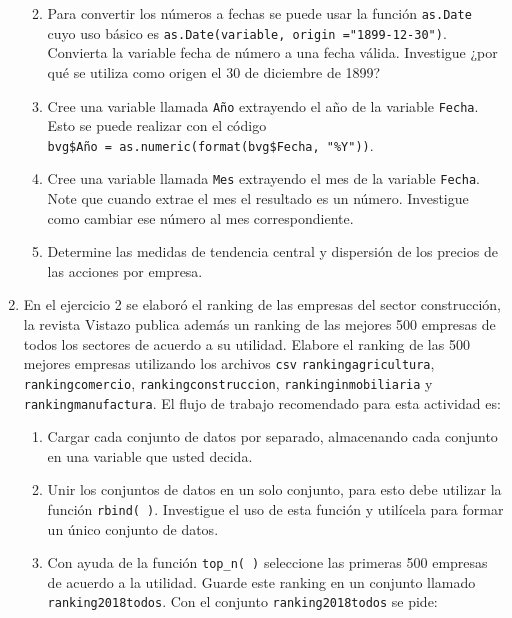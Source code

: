 \documentclass[letterpaper,]{book}
\providecommand{\tightlist}{%
  \setlength{\itemsep}{0pt}\setlength{\parskip}{0pt}}
\begin{document}
\begin{enumerate}
  \begin{enumerate}
  \def\labelenumii{\alph{enumii}.}
  \tightlist
  \item
    Para convertir los números a fechas se puede usar la función \texttt{as.Date} cuyo uso básico es \texttt{as.Date(variable,\ origin\ ="1899-12-30")}. Convierta la variable fecha de número a una fecha válida. Investigue ¿por qué se utiliza como origen el 30 de diciembre de 1899?
  \item
    Cree una variable llamada \texttt{Año} extrayendo el año de la variable \texttt{Fecha}. Esto se puede realizar con el código \texttt{bvg\$Año\ =\ as.numeric(format(bvg\$Fecha,\ "\%Y"))}.
  \item
    Cree una variable llamada \texttt{Mes} extrayendo el mes de la variable \texttt{Fecha}. Note que cuando extrae el mes el resultado es un número. Investigue como cambiar ese número al mes correspondiente.
  \item
    Determine las medidas de tendencia central y dispersión de los precios de las acciones por empresa.
  \end{enumerate}
\item
  En el ejercicio 2 se elaboró el ranking de las empresas del sector construcción, la revista Vistazo publica además un ranking de las mejores 500 empresas de todos los sectores de acuerdo a su utilidad. Elabore el ranking de las 500 mejores empresas utilizando los archivos \texttt{csv} \texttt{rankingagricultura}, \texttt{rankingcomercio}, \texttt{rankingconstruccion}, \texttt{rankinginmobiliaria} y \texttt{rankingmanufactura}. El flujo de trabajo recomendado para esta actividad es:

  \begin{enumerate}
  \def\labelenumii{\alph{enumii}.}
  \tightlist
  \item
    Cargar cada conjunto de datos por separado, almacenando cada conjunto en una variable que usted decida.
  \item
    Unir los conjuntos de datos en un solo conjunto, para esto debe utilizar la función \texttt{rbind(\ )}. Investigue el uso de esta función y utilícela para formar un único conjunto de datos.
  \item
    Con ayuda de la función \texttt{top\_n(\ )} seleccione las primeras 500 empresas de acuerdo a la utilidad. Guarde este ranking en un conjunto llamado \texttt{ranking2018todos}. Con el conjunto \texttt{ranking2018todos} se pide:


\end{enumerate}
\end{enumerate}
\end{document}
